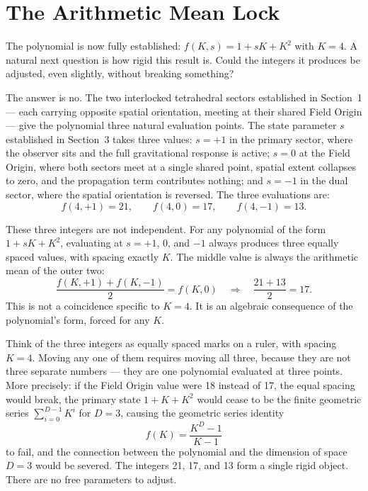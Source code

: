 \documentclass[a4paper,11pt]{article}
\begin{document}
\section{The Arithmetic Mean Lock}

The polynomial is now fully established: $f(K,s) = 1 + sK + K^2$
with $K = 4$. A natural next question is how rigid this
result is. Could the integers it produces be adjusted, even
slightly, without breaking something?

The answer is no. The two interlocked tetrahedral sectors
established in Section~1 --- each carrying opposite spatial
orientation, meeting at their shared Field Origin --- give
the polynomial three natural evaluation points. The state
parameter $s$ established in Section~3 takes three values:
$s = +1$ in the primary sector, where the observer sits
and the full gravitational response is active; $s = 0$ at
the Field Origin, where both sectors meet at a single
shared point, spatial extent collapses to zero, and the
propagation term contributes nothing; and $s = -1$ in the
dual sector, where the spatial orientation is reversed.
The three evaluations are:
\begin{equation}
  f(4,+1) = 21, \qquad f(4,0) = 17, \qquad f(4,-1) = 13.
  \label{eq:states}
\end{equation}

These three integers are not independent. For any polynomial
of the form $1 + sK + K^2$, evaluating at $s = +1$, $0$,
and $-1$ always produces three equally spaced values, with
spacing exactly $K$. The middle value is always the
arithmetic mean of the outer two:
\begin{equation}
  \frac{f(K,+1) + f(K,-1)}{2} = f(K,0)
  \quad\Longrightarrow\quad
  \frac{21 + 13}{2} = 17.
  \label{eq:lock}
\end{equation}
This is not a coincidence specific to $K = 4$. It is an
algebraic consequence of the polynomial's form, forced
for any $K$.

Think of the three integers as equally spaced marks on a
ruler, with spacing $K = 4$. Moving any one of them
requires moving all three, because they are not three
separate numbers --- they are one polynomial evaluated
at three points. More precisely: if the Field Origin
value were 18 instead of 17, the equal spacing would
break, the primary state $1 + K + K^2$ would cease to
be the finite geometric series $\sum_{i=0}^{D-1} K^i$ for
$D = 3$, causing the geometric series identity
\begin{equation}
  f(K) = \frac{K^D - 1}{K - 1}
\end{equation}
to fail, and the connection between the polynomial
and the dimension of space $D = 3$ would be severed.
The integers 21, 17, and 13 form a single rigid object.
There are no free parameters to adjust.
\end{document}
